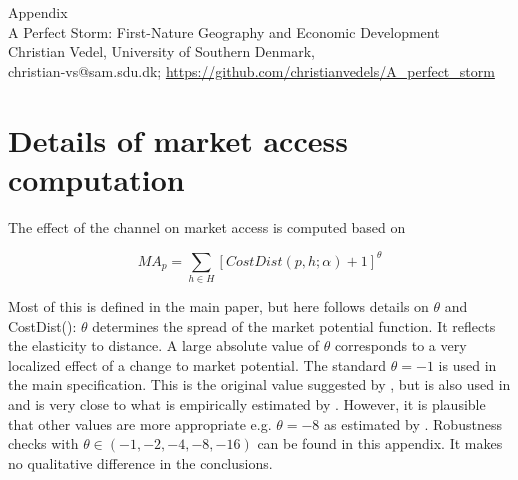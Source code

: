 \setcounter{table}{0}
\setcounter{figure}{0}
\setcounter{section}{0}
\renewcommand*{\thesection}{\Alph{section}}
\renewcommand{\thefigure}{A\arabic{figure}}
\renewcommand{\thetable}{A\arabic{table}}


\begin{title}

    \begin{center}
        
        \Huge
        Appendix \\
        \LARGE
        A Perfect Storm: First-Nature Geography and Economic Development \\
        
        \vspace{0.5cm}
        \Large
        Christian Vedel, University of Southern Denmark,\\
        \small
        christian-vs@sam.sdu.dk; 
        \url{https://github.com/christianvedels/A_perfect_storm}
        
    \end{center}

    \localtableofcontents %
        
    \vfill
    
\end{title}


\section{Details of market access computation}

The effect of the channel on market access is computed based on 

\begin{equation}
\label{eq:MA2}
{MA}_p = \sum_{h \in H} [CostDist(p, h; \alpha) + 1]^\theta
\end{equation}

Most of this is defined in the main paper, but here follows details on $\theta$ and CostDist(): $\theta$ determines the spread of the market potential function. It reflects the elasticity to distance. A large absolute value of $\theta$ corresponds to a very localized effect of a change to market potential. The standard $\theta = -1$ is used in the main specification.  This is the original value suggested by \cite{Harris1954}, but is also used in \cite{rauch2022a} and is very close to what is empirically estimated by \cite{Redding2008}. However, it is plausible that other values are more appropriate e.g. $\theta = -8$ as estimated by \cite{Donaldson2016}. Robustness checks with $\theta \in (-1, -2, -4, -8, -16)$ can be found in this appendix. It makes no qualitative difference in the conclusions.  

